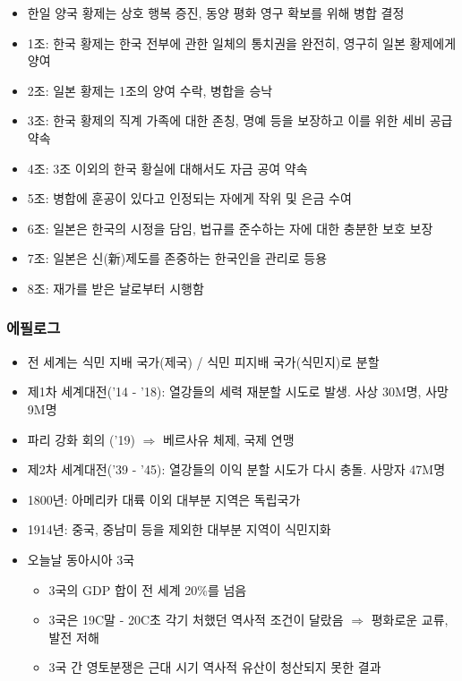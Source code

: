 \begin{itemize}
    \item 한일 양국 황제는 상호 행복 증진, 동양 평화 영구 확보를 위해 병합 결정
    \item 1조: 한국 황제는 한국 전부에 관한 일체의 통치권을 완전히, 영구히 일본 황제에게 양여
    \item 2조: 일본 황제는 1조의 양여 수락, 병합을 승낙
    \item 3조: 한국 황제의 직계 가족에 대한 존칭, 명예 등을 보장하고 이를 위한 세비 공급 약속
    \item 4조: 3조 이외의 한국 황실에 대해서도 자금 공여 약속
    \item 5조: 병합에 훈공이 있다고 인정되는 자에게 작위 및 은금 수여
    \item 6조: 일본은 한국의 시정을 담임, 법규를 준수하는 자에 대한 충분한 보호 보장
    \item 7조: 일본은 신(新)제도를 존중하는 한국인을 관리로 등용
    \item 8조: 재가를 받은 날로부터 시행함
\end{itemize}

\subsubsection*{에필로그}

\begin{itemize}
    \item 전 세계는 식민 지배 국가(제국) / 식민 피지배 국가(식민지)로 분할
    \item 제1차 세계대전('14 - '18): 열강들의 세력 재분할 시도로 발생. 사상 30M명, 사망 9M명
    \item 파리 강화 회의 ('19) $\Rightarrow$ 베르사유 체제, 국제 연맹
    \item 제2차 세계대전('39 - '45): 열강들의 이익 분할 시도가 다시 충돌. 사망자  47M명
    \item 1800년: 아메리카 대륙 이외 대부분 지역은 독립국가
    \item 1914년: 중국, 중남미 등을 제외한 대부분 지역이 식민지화
    \item 오늘날 동아시아 3국
    \begin{itemize}
        \item 3국의 GDP 합이 전 세계 20\%를 넘음
        \item 3국은 19C말 - 20C초 각기 처했던 역사적 조건이 달랐음
            $\Rightarrow$ 평화로운 교류, 발전 저해
        \item 3국 간 영토분쟁은 근대 시기 역사적 유산이 청산되지 못한 결과
    \end{itemize}
\end{itemize}
